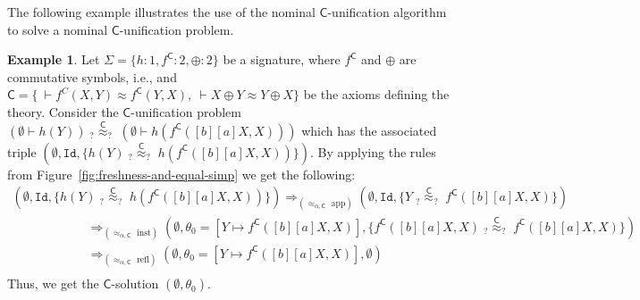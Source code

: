 \documentclass[submission,copyright,creativecommons]{eptcs}
\newcommand{\caleq}{\approx_{\alpha,\theory{C}}}
\newcommand{\theory}[1]{\ensuremath{\mathsf{#1}}}
\theoremstyle{plain}
\theoremstyle{definition}
\newtheorem{example}{Example}[section]
\theoremstyle{remark}
\begin{document}

The following example illustrates the use of the nominal \theory{C}-unification algorithm to solve a nominal \theory{C}-unification problem.

\begin{example}\label{ex:c-unification} Let $\Sigma = \{h:1, f^\theory{C}:2, \oplus: 2\}$ be a signature, where $f^\theory{C}$ and $\oplus$ are commutative symbols, i.e., and $\theory{C} =\{ \ \vdash f^C(X,Y) \approx f^\theory{C}(Y,X), \ \vdash X\oplus Y \approx Y\oplus X\}$ be the axioms defining the theory. Consider the \theory{C}-unification problem
     $(\emptyset \vdash h(Y)) \; _?{\overset{\theory{C}}{\approx}}_? \; (\emptyset \vdash h(f^\theory{C}([b][a]X,X)))$  which has the associated triple $(\emptyset, \mathtt{Id}, \{h(Y) \; _?{\overset{\theory{C}}{\approx}}_? \; h(f^\theory{C}([b][a]X,X))\})$. By applying the rules from Figure~\ref{fig:freshness-and-equal-simp} we get the following:
{\small
$$
\begin{array}{l}
    (\emptyset, \mathtt{Id}, \{h(Y) \; _?{\overset{\theory{C}}{\approx}}_? \; h(f^\theory{C}([b][a]X,X))\})  
    \Longrightarrow_{(\caleq \text{\ app})}  (\emptyset, \mathtt{Id}, \{Y \; _?{\overset{\theory{C}}{\approx}}_? \; f^\theory{C}([b][a]X,X)\}) \\
    \qquad \qquad \qquad \Longrightarrow_{(\caleq \text{\ inst})}  (\emptyset, \theta_0 = [Y\mapsto f^\theory{C}([b][a]X,X)], \{f^\theory{C}([b][a]X,X) \; _?{\overset{\theory{C}}{\approx}}_? \; f^\theory{C}([b][a]X,X)\})  \\
    \qquad \qquad \qquad \Longrightarrow_{(\caleq \text{\ refl})}  (\emptyset, \theta_0 = [Y\mapsto f^\theory{C}([b][a]X,X)], \emptyset)\\
\end{array}
$$
}
Thus, we get the \theory{C}-solution $(\emptyset, \theta_0)$.



\end{example}
\end{document}
